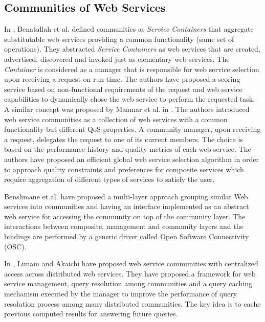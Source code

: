 \subsection{Communities of Web Services}\label{sec:communities_rel}

In \cite{DBLP:journals/internet/BenatallahSD03}, Benatallah et al.
defined communities as \emph{Service Containers} that aggregate
substitutable web services providing a common functionality (same
set of operations). They abstracted \emph{Service Containers} as
web services that are created, advertised, discovered and invoked
just as elementary web services. The \emph{Container} is
considered as a manager that is responsible for web service
selection upon receiving a request on run-time. The authors have
proposed a scoring service based on non-functional requirements of
the request and web service capabilities to dynamically chose the
web service to perform the requested task. A similar concept was
proposed by Maamar et al. in
\cite{DBLP:journals/ijebr/MaamarSTBB09}. The authors introduced
web service communities as a collection of web services with a
common functionality but different QoS properties. A community
manager, upon receiving a request, delegates the request to one of
its current members. The choice is based on the performance
history and quality metrics of each web service. The authors have
proposed an efficient global web service selection algorithm in
order to approach quality constraints and preferences for
composite services which require aggregation of different types of
services to satisfy the user.

Benslimane et al. \cite{Liris-2770} have proposed a multi-layer
approach grouping similar Web services into communities and having
an interface implemented as an abstract web service for accessing
the community on top of the community layer. The interactions
between composite, management and community layers and the
bindings are performed by a generic driver called Open Software
Connectivity (OSC).

In \cite{managing-hela-jalel}, Limam and Akaichi have proposed web
service communities with centralized access across distributed web
services. They have proposed a framework for web service
management, query resolution among communities and a query caching
mechanism executed by the manager to improve the performance of
query resolution process among many distributed communities. The
key idea is to cache previous computed results for answering
future queries.


